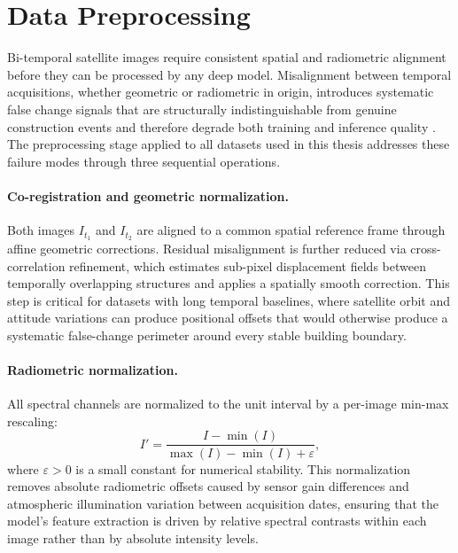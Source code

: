 \section{Data Preprocessing}
\label{sec:preprocessing}

Bi-temporal satellite images require consistent spatial and radiometric alignment before they can be processed by any deep model. Misalignment between temporal acquisitions, whether geometric or radiometric in origin, introduces systematic false change signals that are structurally indistinguishable from genuine construction events and therefore degrade both training and inference quality \cite{Hussain2013Review}. The preprocessing stage applied to all datasets used in this thesis addresses these failure modes through three sequential operations.

\paragraph{Co-registration and geometric normalization.} Both images $I_{t_1}$ and $I_{t_2}$ are aligned to a common spatial reference frame through affine geometric corrections. Residual misalignment is further reduced via cross-correlation refinement, which estimates sub-pixel displacement fields between temporally overlapping structures and applies a spatially smooth correction. This step is critical for datasets with long temporal baselines, where satellite orbit and attitude variations can produce positional offsets that would otherwise produce a systematic false-change perimeter around every stable building boundary.

\paragraph{Radiometric normalization.} All spectral channels are normalized to the unit interval by a per-image min-max rescaling:
\begin{equation}
I' = \frac{I - \min(I)}{\max(I) - \min(I) + \varepsilon},
\label{eq:normalization}
\end{equation}
where $\varepsilon > 0$ is a small constant for numerical stability. This normalization removes absolute radiometric offsets caused by sensor gain differences and atmospheric illumination variation between acquisition dates, ensuring that the model's feature extraction is driven by relative spectral contrasts within each image rather than by absolute intensity levels.

